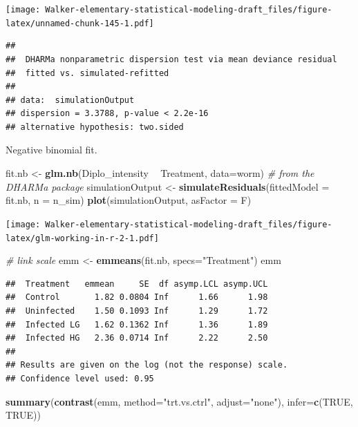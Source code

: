 \documentclass[]{book}
\newenvironment{Shaded}{\begin{snugshade}}{\end{snugshade}}
\newcommand{\CommentTok}[1]{\textcolor[rgb]{0.56,0.35,0.01}{\textit{#1}}}
\newcommand{\DataTypeTok}[1]{\textcolor[rgb]{0.13,0.29,0.53}{#1}}
\newcommand{\KeywordTok}[1]{\textcolor[rgb]{0.13,0.29,0.53}{\textbf{#1}}}
\newcommand{\NormalTok}[1]{#1}
\newcommand{\OperatorTok}[1]{\textcolor[rgb]{0.81,0.36,0.00}{\textbf{#1}}}
\newcommand{\OtherTok}[1]{\textcolor[rgb]{0.56,0.35,0.01}{#1}}
\newcommand{\StringTok}[1]{\textcolor[rgb]{0.31,0.60,0.02}{#1}}
\begin{document}
\texttt{[image: Walker-elementary-statistical-modeling-draft\_files/figure-latex/unnamed-chunk-145-1.pdf]}

\begin{verbatim}
## 
##  DHARMa nonparametric dispersion test via mean deviance residual
##  fitted vs. simulated-refitted
## 
## data:  simulationOutput
## dispersion = 3.3788, p-value < 2.2e-16
## alternative hypothesis: two.sided
\end{verbatim}

Negative binomial fit.

\begin{Shaded}
\begin{Highlighting}[]
\NormalTok{fit.nb <-}\StringTok{ }\KeywordTok{glm.nb}\NormalTok{(Diplo_intensity }\OperatorTok{~}\StringTok{ }\NormalTok{Treatment, }\DataTypeTok{data=}\NormalTok{worm)}
\CommentTok{# from the DHARMa package}
\NormalTok{  simulationOutput <-}\StringTok{ }\KeywordTok{simulateResiduals}\NormalTok{(}\DataTypeTok{fittedModel =}\NormalTok{ fit.nb, }\DataTypeTok{n =}\NormalTok{ n_sim)}
  \KeywordTok{plot}\NormalTok{(simulationOutput, }\DataTypeTok{asFactor =}\NormalTok{ F)}
\end{Highlighting}
\end{Shaded}

\texttt{[image: Walker-elementary-statistical-modeling-draft\_files/figure-latex/glm-working-in-r-2-1.pdf]}

\begin{Shaded}
\begin{Highlighting}[]
\CommentTok{# link scale}
\NormalTok{emm <-}\StringTok{ }\KeywordTok{emmeans}\NormalTok{(fit.nb, }\DataTypeTok{specs=}\StringTok{"Treatment"}\NormalTok{)}
\NormalTok{emm}
\end{Highlighting}
\end{Shaded}

\begin{verbatim}
##  Treatment   emmean     SE  df asymp.LCL asymp.UCL
##  Control       1.82 0.0804 Inf      1.66      1.98
##  Uninfected    1.50 0.1093 Inf      1.29      1.72
##  Infected LG   1.62 0.1362 Inf      1.36      1.89
##  Infected HG   2.36 0.0714 Inf      2.22      2.50
## 
## Results are given on the log (not the response) scale. 
## Confidence level used: 0.95
\end{verbatim}

\begin{Shaded}
\begin{Highlighting}[]
\KeywordTok{summary}\NormalTok{(}\KeywordTok{contrast}\NormalTok{(emm, }\DataTypeTok{method=}\StringTok{"trt.vs.ctrl"}\NormalTok{, }\DataTypeTok{adjust=}\StringTok{"none"}\NormalTok{), }\DataTypeTok{infer=}\KeywordTok{c}\NormalTok{(}\OtherTok{TRUE}\NormalTok{, }\OtherTok{TRUE}\NormalTok{))}
\end{Highlighting}
\end{Shaded}
\end{document}
